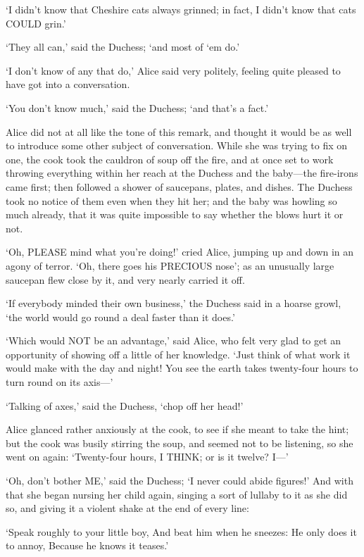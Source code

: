 \documentclass[12pt]{book}
\begin{document}
\begin{Parallel}[p]{}{}
{‘I didn’t know that Cheshire cats always grinned; in fact, I didn’t know that cats COULD grin.’

‘They all can,’ said the Duchess; ‘and most of ‘em do.’

‘I don’t know of any that do,’ Alice said very politely, feeling quite pleased to have got into a conversation.

‘You don’t know much,’ said the Duchess; ‘and that’s a fact.’

Alice did not at all like the tone of this remark, and thought it would be as well to introduce some other subject of conversation. While she was trying to fix on one, the cook took the cauldron of soup off the fire, and at once set to work throwing everything within her reach at the Duchess and the baby—the fire-irons came first; then followed a shower of saucepans, plates, and dishes. The Duchess took no notice of them even when they hit her; and the baby was howling so much already, that it was quite impossible to say whether the blows hurt it or not.

‘Oh, PLEASE mind what you’re doing!’ cried Alice, jumping up and down in an agony of terror. ‘Oh, there goes his PRECIOUS nose’; as an unusually large saucepan flew close by it, and very nearly carried it off.

‘If everybody minded their own business,’ the Duchess said in a hoarse growl, ‘the world would go round a deal faster than it does.’

‘Which would NOT be an advantage,’ said Alice, who felt very glad to get an opportunity of showing off a little of her knowledge. ‘Just think of what work it would make with the day and night! You see the earth takes twenty-four hours to turn round on its axis—’

‘Talking of axes,’ said the Duchess, ‘chop off her head!’

Alice glanced rather anxiously at the cook, to see if she meant to take the hint; but the cook was busily stirring the soup, and seemed not to be listening, so she went on again: ‘Twenty-four hours, I THINK; or is it twelve? I—’

‘Oh, don’t bother ME,’ said the Duchess; ‘I never could abide figures!’ And with that she began nursing her child again, singing a sort of lullaby to it as she did so, and giving it a violent shake at the end of every line:

   ‘Speak roughly to your little boy,
    And beat him when he sneezes:
   He only does it to annoy,
    Because he knows it teases.’

}
\end{Parallel}
\end{document}
